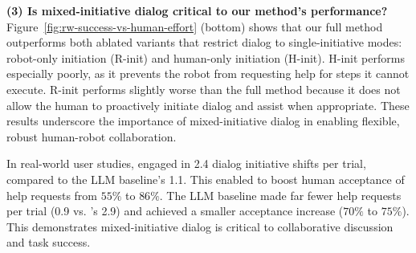 
\textbf{(3) Is mixed-initiative dialog critical to our method's performance?} Figure~\ref{fig:rw-success-vs-human-effort} (bottom) shows that our full method outperforms both ablated variants that restrict dialog to single-initiative modes: robot-only initiation (R-init) and human-only initiation (H-init). H-init performs especially poorly, as it prevents the robot from requesting help for steps it cannot execute. R-init performs slightly worse than the full method because it does not allow the human to proactively initiate dialog and assist when appropriate.
These results underscore the importance of mixed-initiative dialog in enabling flexible, robust human-robot collaboration.


In real-world user studies, \ours{} engaged in 2.4 dialog initiative shifts per trial, compared to the LLM baseline's 1.1. This enabled \ours{} to boost human acceptance of help requests from $55\%$ to $86\%$. The LLM baseline made far fewer help requests per trial (0.9 vs. \ours{}'s 2.9) and achieved a smaller acceptance increase ($70\%$ to $75\%$). This demonstrates mixed-initiative dialog is critical to collaborative discussion and task success.